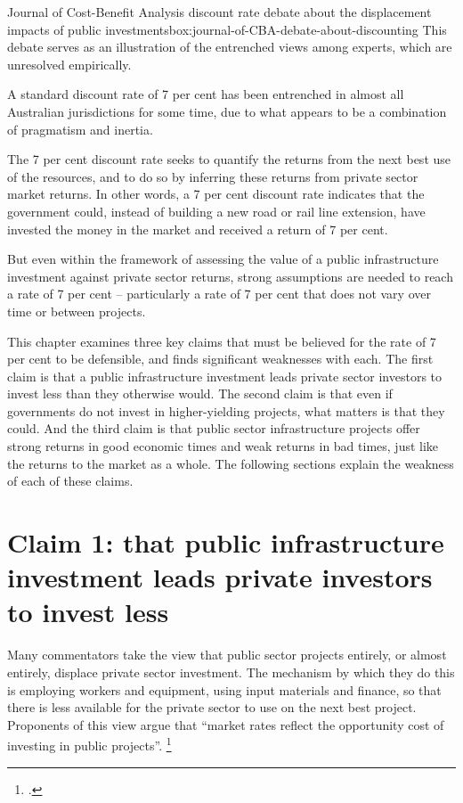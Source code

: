 \begin{bigbox}{Journal of Cost-Benefit Analysis discount rate debate about the displacement impacts of public investments}{box:journal-of-CBA-debate-about-discounting}
This debate serves as an illustration of the entrenched views among experts, which are unresolved empirically.

\end{bigbox}


A standard discount rate of 7 per cent has been entrenched in almost all Australian jurisdictions for some time, due to what appears to be a combination of pragmatism and inertia.

The 7 per cent discount rate seeks to quantify the returns from the next best use of the resources, and to do so by inferring these returns from private sector market returns. In other words, a 7 per cent discount rate indicates that the government could, instead of building a new road or rail line extension, have invested the money in the market and received a return of 7 per cent.

But even within the framework of assessing the value of a public infrastructure investment against private sector returns, strong assumptions are needed to reach a rate of 7 per cent – particularly a rate of 7 per cent that does not vary over time or between projects.

This chapter examines three key claims that must be believed for the rate of 7 per cent to be defensible, and finds significant weaknesses with each. The first claim is that a public infrastructure investment leads private sector investors to invest less than they otherwise would. The second claim is that even if governments do not invest in higher-yielding projects, what matters is that they could. And the third claim is that public sector infrastructure projects offer strong returns in good economic times and weak returns in bad times, just like the returns to the market as a whole. The following sections explain the weakness of each of these claims. 

\section{Claim 1: that public infrastructure investment leads private investors to invest less}

Many commentators take the view that public sector projects entirely, or almost entirely, displace private sector investment. The mechanism by which they do this is employing workers and equipment, using input materials and finance, so that there is less available for the private sector to use on the next best project. Proponents of this view argue that “market rates reflect the opportunity cost of investing in public projects”.%
    \footcite[][viii]{Harrison-Valuing-the-Future}  

